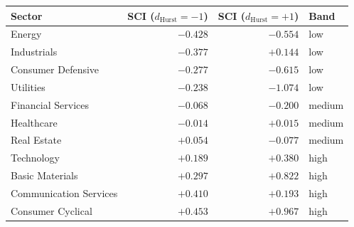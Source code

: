 \begin{tabular}{lrrl}
\toprule
Sector & SCI ($d_{\text{Hurst}}=-1$) & SCI ($d_{\text{Hurst}}=+1$) & Band \\
\midrule
Energy & $-0.428$ & $-0.554$ & low \\
Industrials & $-0.377$ & $+0.144$ & low \\
Consumer Defensive & $-0.277$ & $-0.615$ & low \\
Utilities & $-0.238$ & $-1.074$ & low \\
Financial Services & $-0.068$ & $-0.200$ & medium \\
Healthcare & $-0.014$ & $+0.015$ & medium \\
Real Estate & $+0.054$ & $-0.077$ & medium \\
Technology & $+0.189$ & $+0.380$ & high \\
Basic Materials & $+0.297$ & $+0.822$ & high \\
Communication Services & $+0.410$ & $+0.193$ & high \\
Consumer Cyclical & $+0.453$ & $+0.967$ & high \\
\bottomrule
\end{tabular}
